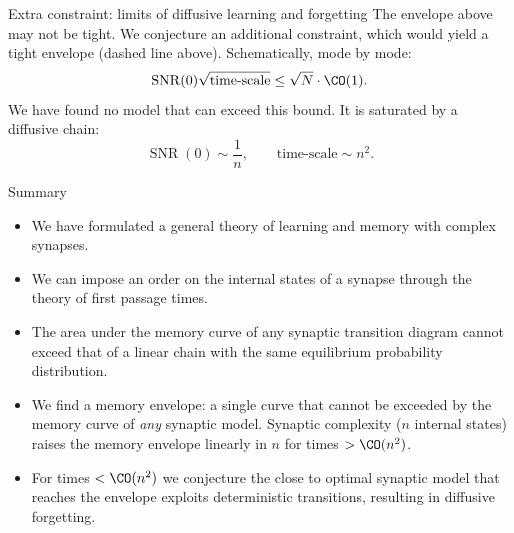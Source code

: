\documentclass[final,hyperref={pdfpagelabels=false,bookmarks=false}]{beamer}
\DeclareMathOperator{\SNR}{SNR}
\begin{document}
\begin{frame}{}
\begin{columns}[t]
\begin{column}{0.32\linewidth}
\begin{block}{Extra constraint: limits of diffusive learning and forgetting}
%
 The envelope above may not be tight.
 We conjecture an additional constraint, which would yield a tight envelope (dashed line above).
 Schematically, mode by mode:
 \begin{equation*}
   \SNR(0)\sqrt{\text{time-scale}} \leq \sqrt{N}\cdot \CO(1).
 \end{equation*}
 We have found no model that can exceed this bound. 
 It is saturated by a diffusive chain:
 \begin{equation*}
   \SNR(0) \sim \frac{1}{n},
   \qquad
   \text{time-scale} \sim n^2.
 \end{equation*}
%
\end{block}

%



\begin{block}{Summary}
%
  \begin{itemize}
    \item We have formulated a general theory of learning and memory with complex synapses.
    \item We can impose an order on the internal states of a synapse through the theory of first passage times.
    \item The area under the memory curve of any synaptic transition diagram cannot exceed that of a linear chain with the same equilibrium probability distribution.
    \item We find a memory envelope: a single curve that cannot be exceeded by the memory curve of \emph{any} synaptic model.  
        Synaptic complexity ($n$ internal states) raises the memory envelope linearly in $n$ for times $> \CO(n^2)$.
    \item For times $< \CO(n^2)$ we conjecture the close to optimal synaptic model that reaches the envelope exploits deterministic transitions, resulting in diffusive forgetting.
  \end{itemize}
%
\end{block}


\end{column}
\end{columns}
\end{frame}
\end{document}
